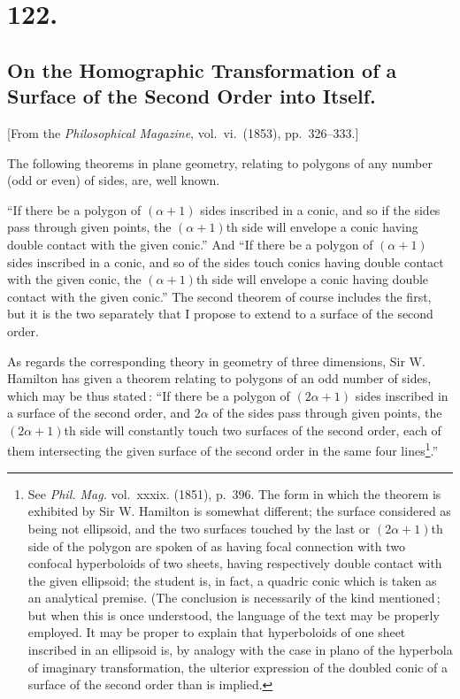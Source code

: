 \documentclass[11pt,a4paper]{book}
\begin{document}
\section*{122.}
\subsection*{On the Homographic Transformation of a Surface of the Second Order into Itself.}

[From the \textit{Philosophical Magazine}, vol.\ vi.\ (1853), pp.\ 326--333.]

\medskip

The following theorems in plane geometry, relating to polygons of any number
(odd or even) of sides, are, well known.

``If there be a polygon of $(\alpha+1)$ sides inscribed in a conic, and so if the
sides pass through given points, the $(\alpha+1)$th side will envelope a conic having double
contact with the given conic.'' And ``If there be a polygon of $(\alpha+1)$ sides inscribed
in a conic, and so of the sides touch conics having double contact with the given
conic, the $(\alpha+1)$th side will envelope a conic having double contact with the given
conic.'' The second theorem of course includes the first, but it is the two separately
that I propose to extend to a surface of the second order.

\medskip

As regards the corresponding theory in geometry of three dimensions, Sir W. Hamilton
has given a theorem relating to polygons of an odd number of sides, which may be
thus stated\,: ``If there be a polygon of $(2\alpha+1)$ sides inscribed in a surface of the
second order, and $2\alpha$ of the sides pass through given points, the $(2\alpha+1)$th side will
constantly touch two surfaces of the second order, each of them intersecting the given
surface of the second order in the same four lines\footnote{See \textit{Phil. Mag.} vol.\ xxxix. (1851), p.\ 396. The form in which the theorem is exhibited by Sir W. Hamilton is somewhat different; the surface considered as being not ellipsoid, and the two surfaces touched by the last or $(2\alpha+1)$th side of the polygon are spoken of as having focal connection with two confocal hyperboloids of two sheets, having respectively double contact with the given ellipsoid; the student is, in fact, a quadric conic which is taken as an analytical premise. (The conclusion is necessarily of the kind mentioned\,; but when this is once understood, the language of the text may be properly employed. It may be proper to explain that hyperboloids of one sheet inscribed in an ellipsoid is, by analogy with the case in plano of the hyperbola of imaginary transformation, the ulterior expression of the doubled conic of a surface of the second order than is implied.}.''
\end{document}
